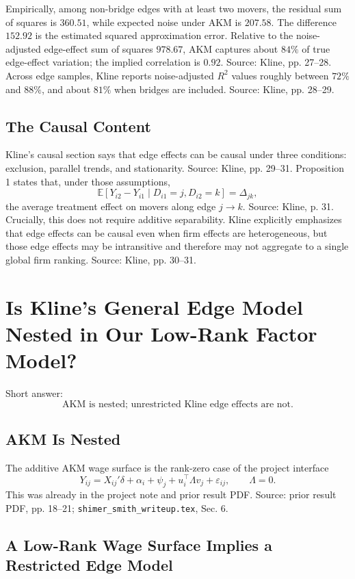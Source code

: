 \documentclass[11pt]{article}
\newcommand{\E}{\mathbb{E}}
\begin{document}
Empirically, among non-bridge edges with at least two movers, the residual sum of
squares is $360.51$, while expected noise under AKM is $207.58$. The difference
$152.92$ is the estimated squared approximation error. Relative to the
noise-adjusted edge-effect sum of squares $978.67$, AKM captures about $84\%$ of
true edge-effect variation; the implied correlation is $0.92$. Source: Kline,
pp. 27--28. Across edge samples, Kline reports noise-adjusted $R^2$ values roughly
between $72\%$ and $88\%$, and about $81\%$ when bridges are included. Source:
Kline, pp. 28--29.

\subsection{The Causal Content}

Kline's causal section says that edge effects can be causal under three conditions:
exclusion, parallel trends, and stationarity. Source: Kline, pp. 29--31. Proposition
1 states that, under those assumptions,
\[
\E[Y_{i2}-Y_{i1}\mid D_{i1}=j,D_{i2}=k]=\Delta_{jk},
\]
the average treatment effect on movers along edge $j\to k$. Source: Kline, p. 31.
Crucially, this does not require additive separability. Kline explicitly emphasizes
that edge effects can be causal even when firm effects are heterogeneous, but those
edge effects may be intransitive and therefore may not aggregate to a single global
firm ranking. Source: Kline, pp. 30--31.

\section{Is Kline's General Edge Model Nested in Our Low-Rank Factor Model?}

Short answer:
\[
\text{AKM is nested; unrestricted Kline edge effects are not.}
\]

\subsection{AKM Is Nested}

The additive AKM wage surface is the rank-zero case of the project interface
\[
Y_{ij}=X_{ij}'\delta+\alpha_i+\psi_j+u_i^\top\Lambda v_j+\varepsilon_{ij},
\qquad
\Lambda=0.
\]
This was already in the project note and prior result PDF. Source: prior result
PDF, pp. 18--21; \texttt{shimer\_smith\_writeup.tex}, Sec. 6.

\subsection{A Low-Rank Wage Surface Implies a Restricted Edge Model}
\end{document}
